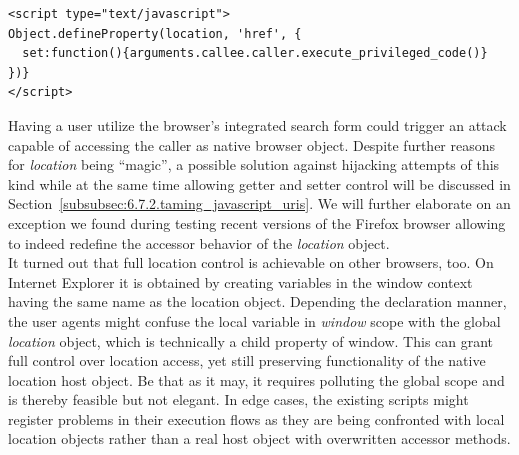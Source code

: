 \begin{lstlisting}[captionpos=b,label=lst:dom-priv-esc,caption=The location.href setter is being overwritten to attempt accessing a privileged method that may be causing a redirect; The code utilizes arguments.callee.caller to access this method]
<script type="text/javascript">
Object.defineProperty(location, 'href', {
  set:function(){arguments.callee.caller.execute_privileged_code()}
})} 
</script>
\end{lstlisting}

    Having a user utilize the browser's integrated search form could trigger an attack capable of accessing the caller as native browser object. Despite further reasons for \textit{location} being ``magic'', a possible solution against hijacking attempts of this kind while at the same time allowing getter and setter control will be discussed in Section~\ref{subsubsec:6.7.2.taming_javascript_uris}. We will further elaborate on an exception we found during testing recent versions of the Firefox browser allowing to indeed redefine the accessor behavior of the \textit{location} object.\\

    It turned out that full location control is achievable on other browsers, too. On Internet Explorer it is obtained by creating variables in the window context having the same name as the location object. Depending the declaration manner, the user agents might confuse the local variable in \textit{window} scope with the global \textit{location} object, which is technically a child property of window. This can grant full control over location access, yet still preserving functionality of the native location host object. Be that as it may, it requires polluting the global scope and is thereby feasible but not elegant. In edge cases, the existing scripts might register problems in their execution flows as they are being confronted with local location objects rather than a real host object with overwritten accessor methods.\\

